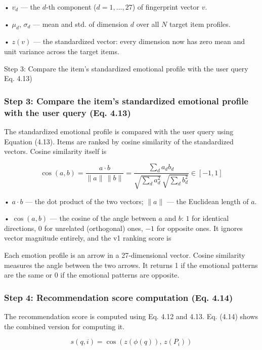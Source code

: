 • $v_d$ --- the $d$-th component ($d=1,\ldots,27$) of fingerprint vector $v$.

• $\mu_d$, $\sigma_d$ --- mean and std. of dimension $d$ over all $N$ target item profiles.

• $z(v)$ --- the standardized vector: every dimension now has zero mean and unit variance across the target items.

Step 3: Compare the item’s standardized emotional profile with the user query Eq. 4.13)

\subsubsection{Step 3: Compare the item's standardized emotional profile with the user query (Eq. 4.13)}
The standardized emotional profile is compared with the user query using Equation (4.13). Items are ranked by cosine similarity of the standardized vectors. Cosine similarity itself is

\begin{equation}
  \cos(a, b) = \frac{a \cdot b}{\|a\| \, \|b\|} = \frac{\sum_{d} a_{d} b_{d}}{\sqrt{\sum_{d} a_{d}^{2}} \, \sqrt{\sum_{d} b_{d}^{2}}} \in [-1, 1]
  \label{eq:ch4_4_13}
\end{equation}

• $a \cdot b$ --- the dot product of the two vectors; $\|a\|$ --- the Euclidean length of $a$.

• $\cos(a, b)$ --- the cosine of the angle between $a$ and $b$: $1$ for identical directions, $0$ for unrelated (orthogonal) ones, $-1$ for opposite ones. It ignores vector magnitude entirely, and the v1 ranking score is

Each emotion profile is an arrow in a 27-dimensional vector. Cosine similarity measures the angle between the two arrows. It returns 1 if the emotional patterns are the same or 0 if the emotional patterns are opposite.

\subsubsection{Step 4: Recommendation score computation (Eq. 4.14)}
The recommendation score is computed using Eq. 4.12 and 4.13. Eq. (4.14) shows the combined version for computing it.

\begin{equation}
  s(q, i) = \cos\left( z(\phi(q)), \, z(P_{i}) \right)
  \label{eq:ch4_4_14}
\end{equation}

